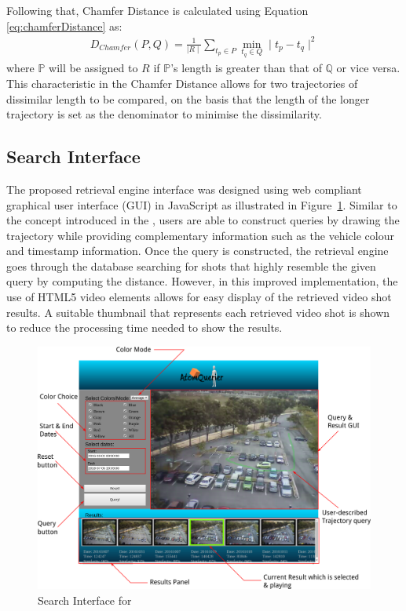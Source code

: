 Following that, Chamfer Distance is calculated using Equation
\ref{eq:chamferDistance} as:
\begin{align}
\label{eq:chamferDistance}
D_{Chamfer} (P,Q) = \frac{1}{\mid R \mid} \sum_{t_p \in P} \min_{t_q \in Q}  \mid t_p - t_q \mid^{2}
\end{align}
where $\mathbb{P}$ will be assigned to $R$ if $\mathbb{P}$'s length is greater than that of $\mathbb{Q}$ or vice versa. This characteristic in the Chamfer Distance allows for two trajectories of dissimilar length to be compared, on the basis that the length of the longer trajectory is set as the denominator to minimise the dissimilarity. 

\subsection{Search Interface}
The proposed retrieval engine interface was designed using web compliant graphical user interface (GUI) in JavaScript as illustrated in Figure~\ref{fig:versionTwoInterface}. Similar to the concept introduced in the \versionOneRet, users are able to construct queries by drawing the trajectory while providing complementary information such as the vehicle colour and timestamp information. Once the query is constructed, the retrieval engine goes through the database searching for shots that highly resemble the given query by computing the
distance. However, in this improved implementation, the use of HTML5 video elements allows for easy display of the retrieved video shot results. A suitable thumbnail that represents each retrieved video shot is shown to reduce the processing time needed to show the results. %

\begin{figure}[tb!]\centering
\includegraphics[width=\textwidth]{image/retrievalTwo/VISERinterface2.png}
\caption{Search Interface for \versionTwoRet}
\label{fig:versionTwoInterface}
\end{figure}


